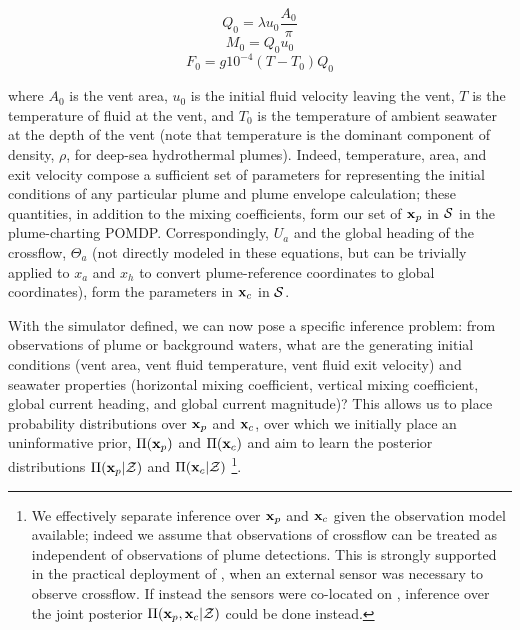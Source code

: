 \begin{equation}
    Q_0 = \lambda u_0 \frac{A_0}{\pi}
\label{eq:heat_flux}
\end{equation}
\begin{equation}
    M_0 = Q_0 u_0
\label{eq:momentum_flux}
\end{equation}
\begin{equation}
    F_0 = g10^{-4}(T-T_0)Q_0
\label{eq:buoyancy_flux}
\end{equation}

\noindent where $A_0$ is the vent area, $u_0$ is the initial fluid velocity leaving the vent, $T$ is the temperature of fluid at the vent, and $T_0$ is the temperature of ambient seawater at the depth of the vent (note that temperature is the dominant component of density, $\rho$, for deep-sea hydrothermal plumes). Indeed, temperature, area, and exit velocity compose a sufficient set of parameters for representing the initial conditions of any particular plume and plume envelope calculation; these quantities, in addition to the mixing coefficients, form our set of $\mathbf{x}_p$ in $\mathcal{S}$ in the plume-charting POMDP. Correspondingly, $U_a$ and the global heading of the crossflow, $\Theta_a$ (not directly modeled in these equations, but can be trivially applied to $x_a$ and $x_h$ to convert plume-reference coordinates to global coordinates), form the parameters in $\mathbf{x}_c$ in $\mathcal{S}$.

With the simulator defined, we can now pose a specific inference problem: from observations of plume or background waters, what are the generating initial conditions (vent area, vent fluid temperature, vent fluid exit velocity) and seawater properties (horizontal mixing coefficient, vertical mixing coefficient, global current heading, and global current magnitude)? This allows us to place probability distributions over $\mathbf{x}_p$ and $\mathbf{x}_c$, over which we initially place an uninformative prior, $\Pi(\mathbf{x}_p)$ and $\Pi(\mathbf{x}_c)$ and aim to learn the posterior distributions $\Pi(\mathbf{x}_p | \mathcal{Z})$ and $\Pi(\mathbf{x}_c | \mathcal{Z})$ \footnote{We effectively separate inference over $\mathbf{x}_p$ and $\mathbf{x}_c$ given the observation model available; indeed we assume that observations of crossflow can be treated as independent of observations of plume detections. This is strongly supported in the practical deployment of \Sentry, when an external sensor was necessary to observe crossflow. If instead the sensors were co-located on \Sentry, inference over the joint posterior $\Pi(\mathbf{x}_p, \mathbf{x}_c | \mathcal{Z})$ could be done instead.}.


